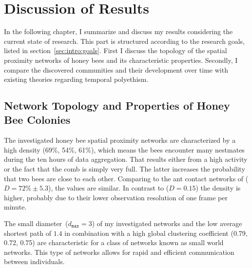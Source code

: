 \section{Discussion of Results}

In the following chapter, I summarize and discuss my results considering the current state of research.
This part is structured according to the research goals, listed in section~\ref{sec:intro:goals}.
First I discuss the topology of the spatial proximity networks of honey bees and its characteristic properties.
Secondly, I compare the discovered communities and their development over time with existing theories regarding temporal polyethism.

\subsection{Network Topology and Properties of Honey Bee Colonies}
The investigated honey bee spatial proximity networks are characterized by a high density (69\%, 54\%, 61\%), which means the bees encounter many nestmates during the ten hours of data aggregation.
That results either from a high activity or the fact that the comb is simply very full.
The latter increases the probability that two bees are close to each other. 
Comparing to the ant contact networks of \textcite{mersch2013tracking} ($D = 72\%\pm5.3$), the values are similar. In contrast to \textcite{baracchi2014socio} ($D=0.15$) the density is higher, probably due to their lower observation resolution of one frame per minute.


The small diameter~($d_{\texttt{max}}=3$) of my investigated networks and the low average shortest path of $1.4$ in combination with a high global clustering coefficient (0.79, 0.72, 0.75) are characteristic for a class of networks known as small world networks.
This type of networks allows for rapid and efficient communication between individuals.


